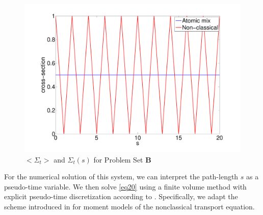\documentclass[12pt]{article}
\newcommand{\bl}{\big<}
\newcommand{\bg}{\big>}
\begin{document}
\begin{figure}[htb]
  \centering
  \includegraphics[scale=0.3]{fig6.pdf}
  \caption{$\bl \Sigma_t\bg$ and $\Sigma_t(s)$ for Problem Set {\bf B}}
  \label{fig6}
\end{figure}

For the numerical solution of this system, we can interpret the path-length $s$ as a pseudo-time variable.
We then solve \cref{eq20} using a finite volume method with explicit pseudo-time discretization according to \cite{hll83}.
Specifically, we adapt the scheme introduced in \cite{kry13} for moment models of the nonclassical transport equation.
\end{document}
